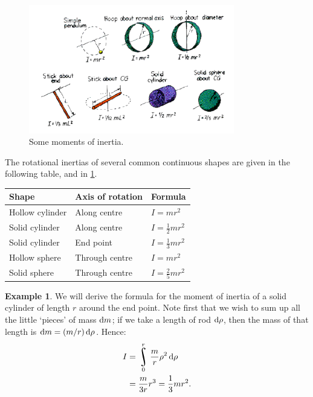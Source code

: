 \documentclass[a4paper]{amsbook}
\theoremstyle{definition}
\newtheorem*{example}{Example}
\numberwithin{exercise}{chapter}
\numberwithin{exercise}{chapter}
\DeclareMathOperator*{\rint}{\scalerel*{\rotatebox{17}{$\!\int\!$}}{\int}}
\begin{document}
\begin{figure}
  \centering
  \includegraphics[width=0.8\textwidth]{inertiamoments}
  \caption{Some moments of inertia.\label{fig:inertias}}
\end{figure}

The rotational inertias of several common continuous shapes are given in the following table, and in \cref{fig:inertias}.
\begin{center}
  \def\arraystretch{1.5}
  \begin{tabular}{lll}\hline
    \textbf{Shape} & \textbf{Axis of rotation} & \textbf{Formula}\\\hline
    Hollow cylinder & Along centre & $ I = mr^2 $\\\hline
    Solid cylinder & Along centre & $ I = \frac{1}{2} mr^2 $\\\hline
    Solid cylinder & End point & $ I = \frac{1}{3} mr^2 $\\\hline
    Hollow sphere & Through centre & $ I = mr^2 $\\\hline
    Solid sphere & Through centre & $ I = \frac{2}{5} mr^2 $\\\hline
  \end{tabular}
\end{center}

\begin{example}
  We will derive the formula for the moment of inertia of a solid cylinder of length $ r $ around the end point. Note first
  that we wish to sum up all the little `pieces' of mass $ \dif{m} $; if we take a length of rod $ \dif{\rho} $, then the
  mass of that length is $ \dif{m} = (m/r) \dif{\rho} $. Hence:
  \begin{align*}
    I &= \rint_0^r \frac{m}{r} \rho^2 \dif{\rho}\\
      &= \frac{m}{3r} r^3 = \frac{1}{3} mr^2.
  \end{align*}
\end{example}
\end{document}
